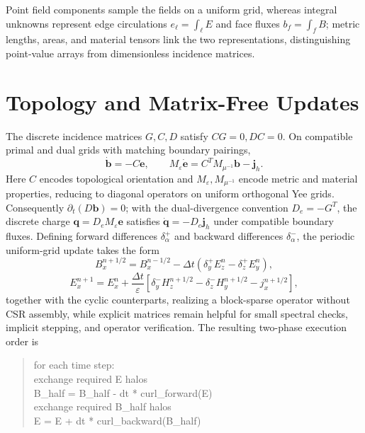 Point field components sample the fields on a uniform grid, whereas integral unknowns represent edge circulations $e_\ell=\int_\ell E$ and face fluxes $b_f=\int_f B$; metric lengths, areas, and material tensors link the two representations, distinguishing point-value arrays from dimensionless incidence matrices.
\section{Topology and Matrix-Free Updates}
The discrete incidence matrices $G,C,D$ satisfy $CG=0,DC=0$. On compatible primal and dual grids with matching boundary pairings,
\[
 \dot{\bm b}=-C\bm e,\qquad
 M_\varepsilon\dot{\bm e}=C^TM_{\mu^{-1}}\bm b-\bm j_h .
\]
Here $C$ encodes topological orientation and $M_\varepsilon,M_{\mu^{-1}}$ encode metric and material properties, reducing to diagonal operators on uniform orthogonal Yee grids. Consequently $\partial_t(D\bm b)=0$; with the dual-divergence convention $D_e=-G^T$, the discrete charge $\bm q=D_eM_\varepsilon\bm e$ satisfies $\dot{\bm q}=-D_e\bm j_h$ under compatible boundary fluxes.
Defining forward differences $\delta_\alpha^+$ and backward differences $\delta_\alpha^-$, the periodic uniform-grid update takes the form
\[
 B_x^{n+1/2}=B_x^{n-1/2}
 -\Delta t(\delta_y^+E_z^n-\delta_z^+E_y^n),
\]
\[
 E_x^{n+1}=E_x^n+\frac{\Delta t}{\varepsilon}
 [\delta_y^-H_z^{n+1/2}-\delta_z^-H_y^{n+1/2}-j_x^{n+1/2}],
\]
together with the cyclic counterparts, realizing a block-sparse operator without CSR assembly, while explicit matrices remain helpful for small spectral checks, implicit stepping, and operator verification. The resulting two-phase execution order is
\begin{quote}\ttfamily\small
for each time step:\\
\quad exchange required E halos\\
\quad B\_half = B\_half - dt * curl\_forward(E)\\
\quad exchange required B\_half halos\\
\quad E = E + dt * curl\_backward(B\_half)
\end{quote}

